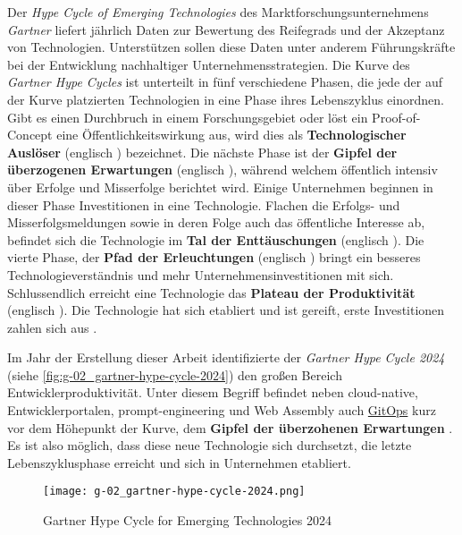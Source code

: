 Der \textit{Hype Cycle of Emerging Technologies} des Marktforschungsunternehmens \textit{Gartner} liefert jährlich Daten zur Bewertung des Reifegrads und der Akzeptanz von Technologien. Unterstützen sollen diese Daten unter anderem Führungskräfte bei der Entwicklung nachhaltiger Unternehmensstrategien. Die Kurve des \textit{Gartner Hype Cycles} ist unterteilt in fünf verschiedene Phasen, die jede der auf der Kurve platzierten Technologien in eine Phase ihres Lebenszyklus einordnen. Gibt es einen Durchbruch in einem Forschungsgebiet oder löst ein Proof-of-Concept eine Öffentlichkeitswirkung aus, wird dies als \textbf{Technologischer Auslöser} (englisch ) bezeichnet. Die nächste Phase ist der \textbf{Gipfel der überzogenen Erwartungen} (englisch ), während welchem öffentlich intensiv über Erfolge und Misserfolge berichtet wird. Einige Unternehmen beginnen in dieser Phase Investitionen in eine Technologie. Flachen die Erfolgs- und Misserfolgsmeldungen sowie in deren Folge auch das öffentliche Interesse ab, befindet sich die Technologie im \textbf{Tal der Enttäuschungen} (englisch ). Die vierte Phase, der \textbf{Pfad der Erleuchtungen} (englisch ) bringt ein besseres Technologieverständnis und mehr Unternehmensinvestitionen mit sich. Schlussendlich erreicht eine Technologie das \textbf{Plateau der Produktivität} (englisch ). Die Technologie hat sich etabliert und ist gereift, erste Investitionen zahlen sich aus \cite{108:Gartner-Hype-Cycle}.

Im Jahr der Erstellung dieser Arbeit identifizierte der \textit{Gartner Hype Cycle 2024} (siehe \autoref{fig:g-02_gartner-hype-cycle-2024}) den großen Bereich Entwicklerproduktivität. Unter diesem Begriff befindet neben \gls{cloud-native}, Entwicklerportalen, \Gls{prompt-engineering} und Web Assembly auch \hyperref[sec:03-03_gitops]{GitOps} kurz vor dem Höhepunkt der Kurve, dem \textbf{Gipfel der überzohenen Erwartungen} \cite{106:Gartner-2024-Hype-Cycle-for-Emerging-Technologies}. Es ist also möglich, dass diese neue Technologie sich durchsetzt, die letzte Lebenszyklusphase erreicht und sich in Unternehmen etabliert.

\begin{figure}[h]
    \centering
    \texttt{[image: g-02\_gartner-hype-cycle-2024.png]}
    \caption{Gartner Hype Cycle for Emerging Technologies 2024 \cite{106:Gartner-2024-Hype-Cycle-for-Emerging-Technologies}}
    \label{fig:g-02_gartner-hype-cycle-2024}
\end{figure}

